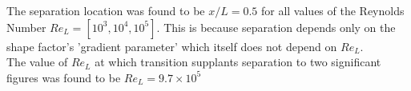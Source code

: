 

\vspace{0.2cm}

The separation location was found to be $x/L = 0.5$ for all values of the Reynolds Number $Re_L = [10^3, 10^4, 10^5]$. This is because separation depends only on the shape factor's 'gradient parameter' which itself does not depend on $Re_L$.\\[5pt]


The value of $Re_L$ at which transition supplants separation to two significant figures was found to be $Re_L = 9.7\times10^5$
